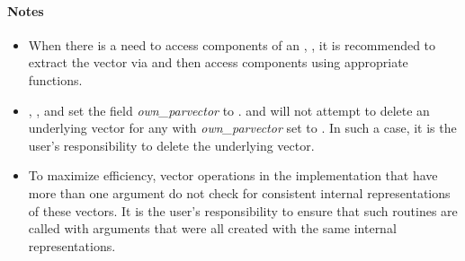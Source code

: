 \paragraph{\bf Notes} 
           
\begin{itemize}
                                        
\item
  When there is a need to access components of an , , 
  it is recommended to extract the {\hypre} vector via       
   and then access components using 
  appropriate {\hypre} functions.        
                                                               
\item
  {\warn}, , 
  and  set the field 
  {\em own\_parvector} to . 
   and 
  will not attempt to delete an underlying {\hypre} vector for any  
  with {\em own\_parvector} set to . In such a case, it is the 
  user's responsibility to delete the underlying vector.

\item
  {\warn}To maximize efficiency, vector operations in the {\nvecph} implementation
  that have more than one  argument do not check for
  consistent internal representations of these vectors. It is the user's 
  responsibility to ensure that such routines are called with 
  arguments that were all created with the same internal representations.

\end{itemize}
